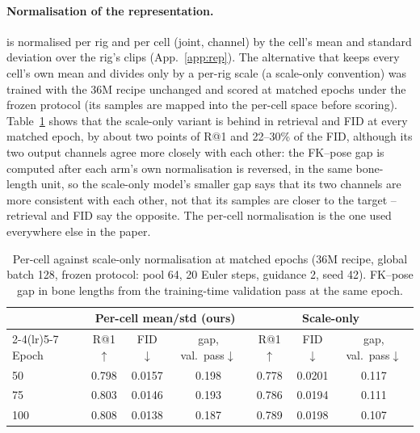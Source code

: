 \paragraph{Normalisation of the representation.} \rep{} is normalised per rig and per cell (joint,
channel) by the cell's mean and standard deviation over the rig's clips (App.~\ref{app:rep}). The
alternative that keeps every cell's own mean and divides only by a per-rig scale (a scale-only
convention) was trained with the \num{36}M recipe unchanged and scored at matched epochs under the
frozen protocol (its samples are mapped into the per-cell space before scoring). Table~\ref{tab:rep}
shows that the scale-only variant is behind in retrieval and FID at every matched epoch, by about two
points of R@1 and \num{22}--\num{30}\% of the FID, although its two output channels agree more closely with each
other: the FK--pose gap is computed after each arm's own normalisation is reversed, in the same bone-length
unit, so the scale-only model's smaller gap says that its two channels are more consistent with each
other, not that its samples are closer to the target -- retrieval and FID say the opposite. The
per-cell normalisation is the one used everywhere else in the paper.

\begin{table}[h]
\centering\footnotesize
\caption{Per-cell against scale-only normalisation at matched epochs (\num{36}M recipe, global batch
128, frozen protocol: pool 64, 20 Euler steps, guidance 2, seed 42). FK--pose gap in bone lengths from
the training-time validation pass at the same epoch.}\label{tab:rep}
\begin{tabular}{lcccccc}
\toprule
& \multicolumn{3}{c}{Per-cell mean/std (ours)} & \multicolumn{3}{c}{Scale-only} \\
\cmidrule(lr){2-4}\cmidrule(lr){5-7}
Epoch & R@1$\uparrow$ & FID$\downarrow$ & gap, val.\ pass$\downarrow$ & R@1$\uparrow$ & FID$\downarrow$ & gap, val.\ pass$\downarrow$ \\
\midrule
50  & \num{0.798} & \num{0.0157} & \num{0.198} & \num{0.778} & \num{0.0201} & \num{0.117} \\
75  & \num{0.803} & \num{0.0146} & \num{0.193} & \num{0.786} & \num{0.0194} & \num{0.111} \\
100 & \num{0.808} & \num{0.0138} & \num{0.187} & \num{0.789} & \num{0.0198} & \num{0.107} \\
\bottomrule
\end{tabular}
\end{table}


